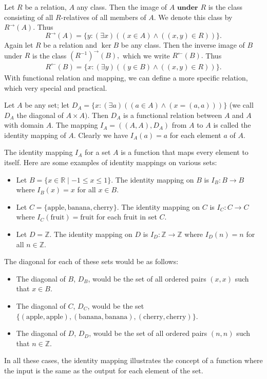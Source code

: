     Let $R$ be a relation, $A$ any class. Then the image of $A\textbf{ under }R$ is the class consisting of all $R$-relatives of all members of $A.$ We denote this class by $R^{\to}(A).$ Thus
    $$
    R^{\to}(A)=\{y:(\exists x)((x\in A)\land((x,y)\in R))\}.
    $$
    Again let $R$ be a relation and $\ker B$ be any class. Then the inverse image of $B$ under $R$ is the class $( R^{- 1}) ^{\to }( B) , $ which we write $R^{\leftarrow}( B) .$ Thus
    $$
    \begin{aligned}R^{\leftarrow}(B)=\{x:(\exists y)((y\in B)\land((x,y)\in R))\}.\end{aligned}
    $$
    With functional relation and mapping, we can define a more specific relation, which very special and practical.
    \begin{definition}
    	Let $A$ be any set; let $D_A=\{x:(\exists a)((a\in A)\land(x=(a,a)))\}$ (we call $D_A$ the diagonal of $A\times A).$ Then $D_A$ is a functional relation between $A$ and $A$ with domain $A.$ The mapping $I_A=((A,A),D_A)$ from $A$ to $A$ is called the identity mapping of $A.$ Clearly we have $I_{A}(a)=a$ for each element $a$ of $A.$
    \end{definition}
   \begin{example}
   	The identity mapping $I_A$ for a set $A$ is a function that maps every element to itself. Here are some examples of identity mappings on various sets:
   	
   	\begin{itemize}
   		\item Let $B = \{x \in \mathbb{R} \mid -1 \leq x \leq 1\}$. The identity mapping on $B$ is $I_B : B \to B$ where $I_B(x) = x$ for all $x \in B$.
   		
   		\item Let $C = \{\text{apple}, \text{banana}, \text{cherry}\}$. The identity mapping on $C$ is $I_C : C \to C$ where $I_C(\text{fruit}) = \text{fruit}$ for each fruit in set $C$.
   		
   		\item Let $D = \mathbb{Z}$. The identity mapping on $D$ is $I_D : \mathbb{Z} \to \mathbb{Z}$ where $I_D(n) = n$ for all $n \in \mathbb{Z}$.
   	\end{itemize}
   	
   	The diagonal for each of these sets would be as follows:
   	\begin{itemize}
   		\item The diagonal of $B$, $D_B$, would be the set of all ordered pairs $(x, x)$ such that $x \in B$.
   		
   		\item The diagonal of $C$, $D_C$, would be the set $\{(\text{apple}, \text{apple}), (\text{banana}, \text{banana}), (\text{cherry}, \text{cherry})\}$.
   		
   		\item The diagonal of $D$, $D_D$, would be the set of all ordered pairs $(n, n)$ such that $n \in \mathbb{Z}$.
   	\end{itemize}
   	
   	In all these cases, the identity mapping illustrates the concept of a function where the input is the same as the output for each element of the set.
   \end{example}
